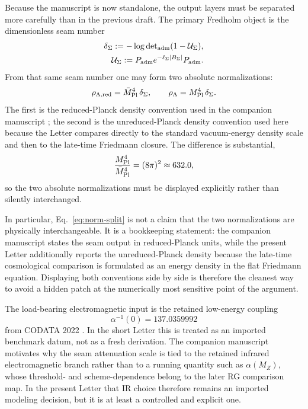 Because the manuscript is now standalone, the output layers must be separated more carefully than in the previous draft. The primary Fredholm object is the dimensionless seam number
\begin{equation}
\begin{aligned}
\delta_{\Sigma}
:=
-\log\det\nolimits_{\mathrm{adm}}(1-\mathcal U_{\Sigma}),\\
\mathcal U_{\Sigma}:=P_{\mathrm{adm}} e^{-\ell_{\Sigma}|B_{\Sigma}|}P_{\mathrm{adm}}.
\end{aligned}
\label{eq:delta-def}
\end{equation}
From that same seam number one may form two absolute normalizations:
\begin{equation}
\rho_{\Lambda,\mathrm{red}}
=
\bar M_{\mathrm{Pl}}^4\,\delta_{\Sigma},
\qquad
\rho_{\Lambda}
=
M_{\mathrm{Pl}}^4\,\delta_{\Sigma}.
\label{eq:norm-split}
\end{equation}
The first is the reduced-Planck density convention used in the companion manuscript \cite{tfpt31}; the second is the unreduced-Planck density convention used here because the Letter compares directly to the standard vacuum-energy density scale and then to the late-time Friedmann closure. The difference is substantial,
\[
\frac{M_{\mathrm{Pl}}^4}{\bar M_{\mathrm{Pl}}^4}
=
(8\pi)^2
\approx
632.0,
\]
so the two absolute normalizations must be displayed explicitly rather than silently interchanged.

In particular, Eq.~\eqref{eq:norm-split} is not a claim that the two normalizations are physically interchangeable. It is a bookkeeping statement: the companion manuscript states the seam output in reduced-Planck units, while the present Letter additionally reports the unreduced-Planck density because the late-time cosmological comparison is formulated as an energy density in the flat Friedmann equation. Displaying both conventions side by side is therefore the cleanest way to avoid a hidden patch at the numerically most sensitive point of the argument.

The load-bearing electromagnetic input is the retained low-energy coupling
\[
\alpha^{-1}(0)=137.0359992
\]
from CODATA 2022 \cite{codata2022}. In the short Letter this is treated as an imported benchmark datum, not as a fresh derivation. The companion manuscript motivates why the seam attenuation scale is tied to the retained infrared electromagnetic branch rather than to a running quantity such as $\alpha(M_Z)$, whose threshold- and scheme-dependence belong to the later RG comparison map. In the present Letter that IR choice therefore remains an imported modeling decision, but it is at least a controlled and explicit one.

